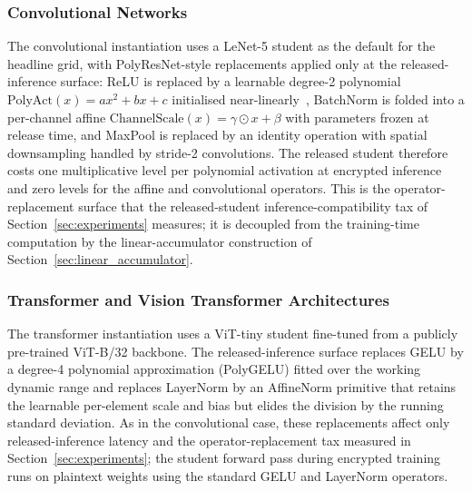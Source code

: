\subsubsection{Convolutional Networks}
\label{sec:arch_cnn}

The convolutional instantiation uses a LeNet-5 student as the default for the headline grid, with PolyResNet-style replacements applied only at the released-inference surface: ReLU is replaced by a learnable degree-2 polynomial $\mathrm{PolyAct}(x) = ax^2 + bx + c$ initialised near-linearly~\cite{baruch2022methodology, garimella2021sisyphus}, BatchNorm is folded into a per-channel affine $\mathrm{ChannelScale}(x) = \gamma\odot x + \beta$ with parameters frozen at release time, and MaxPool is replaced by an identity operation with spatial downsampling handled by stride-2 convolutions. The released student therefore costs one multiplicative level per polynomial activation at encrypted inference and zero levels for the affine and convolutional operators. This is the operator-replacement surface that the released-student inference-compatibility tax of Section~\ref{sec:experiments} measures; it is decoupled from the training-time computation by the linear-accumulator construction of Section~\ref{sec:linear_accumulator}.

\subsubsection{Transformer and Vision Transformer Architectures}
\label{sec:arch_transformer}

The transformer instantiation uses a ViT-tiny student fine-tuned from a publicly pre-trained ViT-B/32 backbone. The released-inference surface replaces GELU by a degree-4 polynomial approximation (PolyGELU) fitted over the working dynamic range and replaces LayerNorm by an AffineNorm primitive that retains the learnable per-element scale and bias but elides the division by the running standard deviation. As in the convolutional case, these replacements affect only released-inference latency and the operator-replacement tax measured in Section~\ref{sec:experiments}; the student forward pass during encrypted training runs on plaintext weights using the standard GELU and LayerNorm operators.
